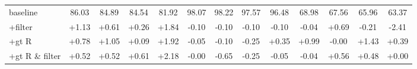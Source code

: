 \begin{table}
\begin{tabular}{lcccccccccccc}
baseline & 86.03 & 84.89 & 84.54 & 81.92 & 98.07 & 98.22 & 97.57 & 96.48 & 68.98 & 67.56 & 65.96 & 63.37 \\
+filter & +1.13 & +0.61 & +0.26 & +1.84 & -0.10 & -0.10 & -0.10 & -0.10 & -0.04 & +0.69 & -0.21 & -2.41 \\
+gt R & +0.78 & +1.05 & +0.09 & +1.92 & -0.05 & -0.10 & -0.25 & +0.35 & +0.99 & -0.00 & +1.43 & +0.39 \\
+gt R \& filter & +0.52 & +0.52 & +0.61 & +2.18 & -0.00 & -0.65 & -0.25 & -0.05 & -0.04 & +0.56 & +0.48 & +0.00 \\
\bottomrule
\end{tabular}
\end{table}
